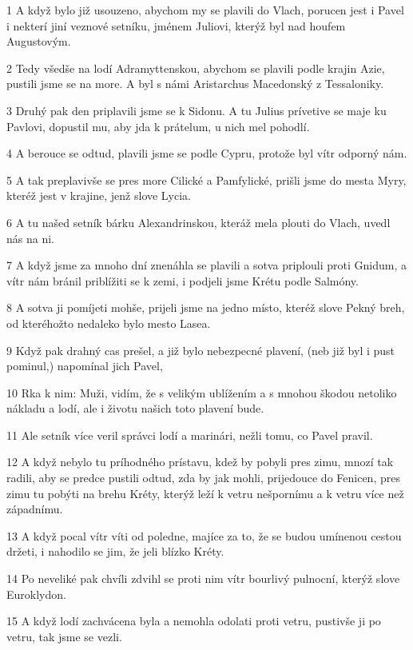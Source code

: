 \par 1 A když bylo již usouzeno, abychom my se plavili do Vlach, porucen jest i Pavel i nekterí jiní veznové setníku, jménem Juliovi, kterýž byl nad houfem Augustovým.
\par 2 Tedy všedše na lodí Adramyttenskou, abychom se plavili podle krajin Azie, pustili jsme se na more. A byl s námi Aristarchus Macedonský z Tessaloniky.
\par 3 Druhý pak den priplavili jsme se k Sidonu. A tu Julius prívetive se maje ku Pavlovi, dopustil mu, aby jda k prátelum, u nich mel pohodlí.
\par 4 A berouce se odtud, plavili jsme se podle Cypru, protože byl vítr odporný nám.
\par 5 A tak preplavivše se pres more Cilické a Pamfylické, prišli jsme do mesta Myry, kteréž jest v krajine, jenž slove Lycia.
\par 6 A tu našed setník bárku Alexandrinskou, kteráž mela plouti do Vlach, uvedl nás na ni.
\par 7 A když jsme za mnoho dní znenáhla se plavili a sotva priplouli proti Gnidum, a vítr nám bránil priblížiti se k zemi, i podjeli jsme Krétu podle Salmóny.
\par 8 A sotva ji pomíjeti mohše, prijeli jsme na jedno místo, kteréž slove Pekný breh, od kteréhožto nedaleko bylo mesto Lasea.
\par 9 Když pak drahný cas prešel, a již bylo nebezpecné plavení, (neb již byl i pust pominul,) napomínal jich Pavel,
\par 10 Rka k nim: Muži, vidím, že s velikým ublížením a s mnohou škodou netoliko nákladu a lodí, ale i životu našich toto plavení bude.
\par 11 Ale setník více veril správci lodí a marinári, nežli tomu, co Pavel pravil.
\par 12 A když nebylo tu príhodného prístavu, kdež by pobyli pres zimu, mnozí tak radili, aby se predce pustili odtud, zda by jak mohli, prijedouce do Fenicen, pres zimu tu pobýti na brehu Kréty, kterýž leží k vetru nešpornímu a k vetru více než západnímu.
\par 13 A když pocal vítr víti od poledne, majíce za to, že se budou umínenou cestou držeti, i nahodilo se jim, že jeli blízko Kréty.
\par 14 Po neveliké pak chvíli zdvihl se proti nim vítr bourlivý pulnocní, kterýž slove Euroklydon.
\par 15 A když lodí zachvácena byla a nemohla odolati proti vetru, pustivše ji po vetru, tak jsme se vezli.
